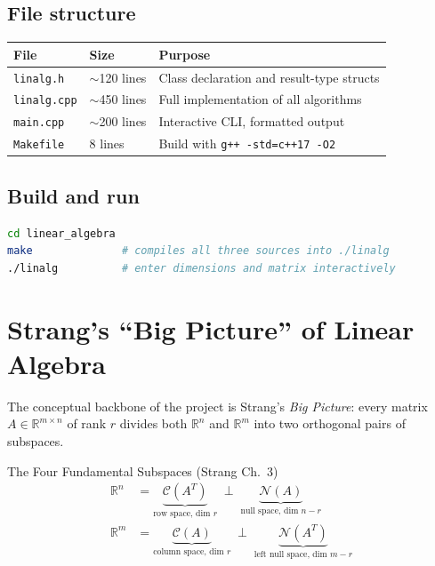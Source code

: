 \documentclass[12pt, a4paper]{article}
\newcommand{\R}{\mathbb{R}}
\newcommand{\Null}{\mathcal{N}}
\newcommand{\Col}{\mathcal{C}}
\begin{document}
\subsection*{File structure}

\begin{center}
\begin{tabular}{lll}
\toprule
File & Size & Purpose \\
\midrule
\texttt{linalg.h}   & $\sim$120 lines & Class declaration and result-type structs \\
\texttt{linalg.cpp} & $\sim$450 lines & Full implementation of all algorithms \\
\texttt{main.cpp}   & $\sim$200 lines & Interactive CLI, formatted output \\
\texttt{Makefile}   & 8 lines         & Build with \texttt{g++ -std=c++17 -O2} \\
\bottomrule
\end{tabular}
\end{center}

\subsection*{Build and run}
\begin{lstlisting}[language=bash, numbers=none]
cd linear_algebra
make              # compiles all three sources into ./linalg
./linalg          # enter dimensions and matrix interactively
\end{lstlisting}

\section{Strang's ``Big Picture'' of Linear Algebra}

The conceptual backbone of the project is Strang's \emph{Big Picture}:
every matrix $A \in \R^{m \times n}$ of rank $r$ divides both $\R^n$ and
$\R^m$ into two orthogonal pairs of subspaces.

\begin{strangbox}{The Four Fundamental Subspaces (Strang Ch.\ 3)}
\begin{align*}
  \R^n &= \underbrace{\Col(A^T)}_{\text{row space, dim }r}
         \;\perp\;
         \underbrace{\Null(A)}_{\text{null space, dim }n-r} \\[1em]
  \R^m &= \underbrace{\Col(A)}_{\text{column space, dim }r}
         \;\perp\;
         \underbrace{\Null(A^T)}_{\text{left null space, dim }m-r}
\end{align*}
\end{strangbox}
\end{document}
